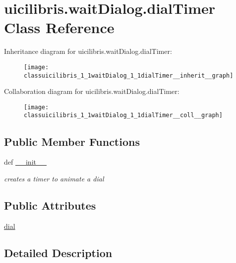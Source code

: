 \hypertarget{classuicilibris_1_1waitDialog_1_1dialTimer}{\section{uicilibris.\-wait\-Dialog.\-dial\-Timer \-Class \-Reference}
\label{classuicilibris_1_1waitDialog_1_1dialTimer}
}


\-Inheritance diagram for uicilibris.\-wait\-Dialog.\-dial\-Timer\-:
\nopagebreak
\begin{figure}[H]
\begin{center}
\leavevmode
\texttt{[image: classuicilibris\_1\_1waitDialog\_1\_1dialTimer\_\_inherit\_\_graph]}
\end{center}
\end{figure}


\-Collaboration diagram for uicilibris.\-wait\-Dialog.\-dial\-Timer\-:
\nopagebreak
\begin{figure}[H]
\begin{center}
\leavevmode
\texttt{[image: classuicilibris\_1\_1waitDialog\_1\_1dialTimer\_\_coll\_\_graph]}
\end{center}
\end{figure}
\subsection*{\-Public \-Member \-Functions}
\begin{DoxyCompactItemize}
\item 
def \hyperlink{classuicilibris_1_1waitDialog_1_1dialTimer_a4e35d02f861135b4651333cbb2a529a9}{\-\_\-\-\_\-init\-\_\-\-\_\-}
\begin{DoxyCompactList}\small\item\em creates a timer to animate a dial \end{DoxyCompactList}\end{DoxyCompactItemize}
\subsection*{\-Public \-Attributes}
\begin{DoxyCompactItemize}
\item 
\hyperlink{classuicilibris_1_1waitDialog_1_1dialTimer_a920091fc039700f280cd852b0e23a405}{dial}
\end{DoxyCompactItemize}


\subsection{\-Detailed \-Description}


